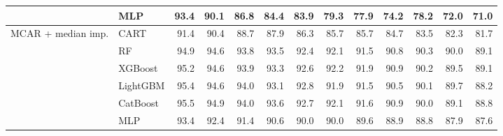 \begin{table}[p]
\begin{tabular}{@{}llrrrrrrrrrrr@{}}
 & MLP & 93.4 & 90.1 & 86.8 & 84.4 & 83.9 & 79.3 & 77.9 & 74.2 & 78.2 & 72.0 & 71.0 \\
\midrule
MCAR + median imp. & CART & 91.4 & 90.4 & 88.7 & 87.9 & 86.3 & 85.7 & 85.7 & 84.7 & 83.5 & 82.3 & 81.7 \\
 & RF & 94.9 & 94.6 & 93.8 & 93.5 & 92.4 & 92.1 & 91.5 & 90.8 & 90.3 & 90.0 & 89.1 \\
 & XGBoost & 95.2 & 94.6 & 93.9 & 93.3 & 92.6 & 92.2 & 91.9 & 90.9 & 90.2 & 89.5 & 89.1 \\
 & LightGBM & 95.4 & 94.6 & 94.0 & 93.1 & 92.8 & 91.9 & 91.5 & 90.5 & 90.1 & 89.7 & 88.2 \\
 & CatBoost & 95.5 & 94.9 & 94.0 & 93.6 & 92.7 & 92.1 & 91.6 & 90.9 & 90.0 & 89.1 & 88.8 \\
 & MLP & 93.4 & 92.4 & 91.4 & 90.6 & 90.0 & 90.0 & 89.6 & 88.9 & 88.8 & 87.9 & 87.6 \\
\bottomrule
\end{tabular}
\end{table}


